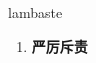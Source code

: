 
\begin{frame}
{\huge lambaste}
\begin{center}
\begin{enumerate}\Large
  \item \textbf{严厉斥责}
\end{enumerate}
\end{center}
\end{frame}
